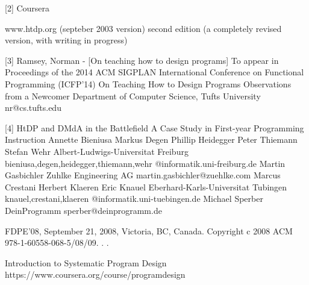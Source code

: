 \documentclass{article}
\begin{document}
[2]	Coursera

www.htdp.org (septeber 2003 version)
second edition (a completely revised version, with writing in progress)


[3] Ramsey, Norman - [On teaching how to design programs]
To appear in Proceedings of the 2014 ACM SIGPLAN International Conference on Functional Programming (ICFP'14)
On Teaching How to Design Programs
Observations from a Newcomer
Department of Computer Science, Tufts University
nr@cs.tufts.edu


[4]	HtDP and DMdA in the Battlefield
A Case Study in First-year Programming Instruction
Annette Bieniusa
Markus Degen
Phillip Heidegger
Peter Thiemann
Stefan Wehr
Albert-Ludwigs-Universitat Freiburg
{bieniusa,degen,heidegger,thiemann,wehr}
@informatik.uni-freiburg.de
Martin Gasbichler
Zuhlke Engineering AG
martin.gasbichler@zuehlke.com
Marcus Crestani
Herbert Klaeren
Eric Knauel
Eberhard-Karls-Universitat Tubingen
{knauel,crestani,klaeren}
@informatik.uni-tuebingen.de
Michael Sperber
DeinProgramm
sperber@deinprogramm.de

FDPE’08, September 21, 2008, Victoria, BC, Canada.
Copyright 
c 2008 ACM 978-1-60558-068-5/08/09. . .


Introduction to Systematic Program Design
https://www.coursera.org/course/programdesign



\printglossaries
\end{document}
